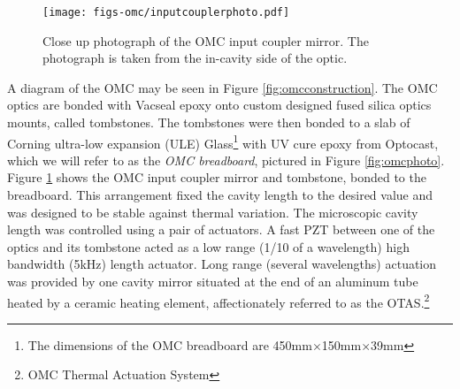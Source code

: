 \begin{figure}
  \begin{center}
  \leavevmode
  \texttt{[image: figs-omc/inputcouplerphoto.pdf]}
  \end{center}
  \caption[Close up photograph of the OMC input coupler mirror.]{Close up photograph of the OMC input coupler mirror. The photograph is taken from the in-cavity side of the optic.}
  \label{fig:inputcouplerphoto}
\end{figure}

A diagram of the OMC may be seen in Figure \ref{fig:omcconstruction}. %
The OMC optics are bonded with Vacseal epoxy onto custom designed fused silica optics mounts, called tombstones. %
 The tombstones were then bonded to a slab of Corning ultra-low expansion (ULE) Glass\footnote{The dimensions of the OMC breadboard are 450mm$\times$150mm$\times$39mm} with UV cure epoxy from Optocast, which we will refer to as the \emph{OMC breadboard}, pictured in Figure \ref{fig:omcphoto}. %
Figure \ref{fig:inputcouplerphoto} shows the OMC input coupler mirror and tombstone, bonded to the breadboard. %
This arrangement fixed the cavity length to the desired value and was designed to be stable against thermal variation. %
The microscopic cavity length was controlled using a pair of actuators. %
A fast PZT between one of the optics and its tombstone acted as a low range (1/10 of a wavelength) high bandwidth (5kHz) length actuator. %
Long range (several wavelengths) actuation was provided by one cavity mirror situated at the end of an aluminum tube heated by a ceramic heating element, affectionately referred to as the OTAS.\footnote{OMC Thermal Actuation System}

